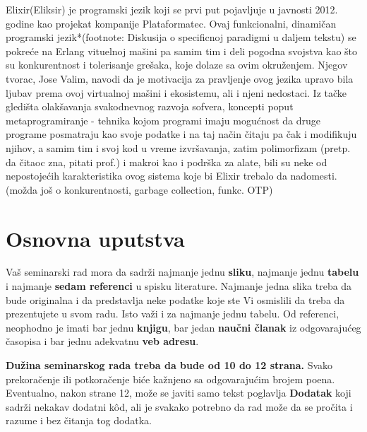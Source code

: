 \documentclass[a4paper]{article}
\begin{document}
Elixir(Eliksir) je programski jezik koji se prvi put pojavljuje u javnosti 2012. godine kao projekat kompanije Plataformatec. Ovaj funkcionalni, dinamičan programski jezik*(footnote: Diskusija o specificnoj paradigmi u daljem tekstu) se pokreće na Erlang vituelnoj mašini pa samim tim i deli pogodna svojstva kao što su konkurentnost i tolerisanje grešaka, koje dolaze sa ovim okruženjem. Njegov tvorac, Jose Valim, navodi da je motivacija za pravljenje ovog jezika upravo bila ljubav prema ovoj virtualnoj mašini i ekosistemu, ali i njeni nedostaci. Iz tačke gledišta olakšavanja svakodnevnog razvoja sofvera, koncepti poput metaprogramiranje - tehnika kojom programi imaju mogućnost da druge programe posmatraju kao svoje podatke i na taj način čitaju pa čak i modifikuju njihov, a samim tim i svoj kod u vreme izvršavanja, zatim polimorfizam (pretp. da čitaoc zna, pitati prof.) i makroi kao i podrška za alate, bili su neke od nepostojećih karakteristika ovog sistema koje bi Elixir trebalo da nadomesti.
(možda još o konkurentnosti, garbage collection, funkc. OTP)

\section{Osnovna uputstva}
Vaš seminarski rad mora da sadrži najmanje jednu \textbf{sliku}, najmanje jednu \textbf{tabelu} i najmanje \textbf{sedam referenci} u spisku literature. Najmanje jedna slika treba da bude originalna i da predstavlja neke podatke koje ste Vi osmislili da treba da prezentujete u svom radu. Isto važi i za najmanje jednu tabelu. 	Od referenci, neophodno je imati bar jednu \textbf{knjigu}, bar jedan \textbf{naučni članak} iz odgovarajućeg časopisa i bar jednu adekvatnu \textbf{veb adresu}.

\textbf{Dužina seminarskog rada treba da bude od 10 do 12 strana.} Svako prekoračenje ili potkoračenje biće kažnjeno sa odgovarajućim brojem poena. Eventualno, nakon strane 12, može se javiti samo tekst poglavlja \textbf{Dodatak} koji sadrži nekakav dodatni k\^{o}d, ali je svakako potrebno da rad može da se pročita i razume i bez čitanja tog dodatka.
\end{document}
